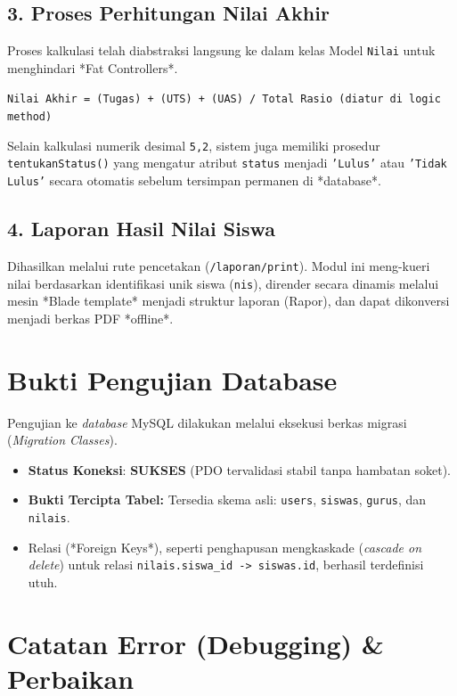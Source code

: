 \documentclass[12pt, a4paper]{article}
\begin{document}
\subsection{3. Proses Perhitungan Nilai Akhir}
Proses kalkulasi telah diabstraksi langsung ke dalam kelas Model \texttt{Nilai} untuk menghindari *Fat Controllers*. 
\begin{center}
\texttt{Nilai Akhir = (Tugas) + (UTS) + (UAS) / Total Rasio (diatur di logic method)}
\end{center}
Selain kalkulasi numerik desimal \texttt{5,2}, sistem juga memiliki prosedur \texttt{tentukanStatus()} yang mengatur atribut \texttt{status} menjadi \texttt{'Lulus'} atau \texttt{'Tidak Lulus'} secara otomatis sebelum tersimpan permanen di *database*.

\subsection{4. Laporan Hasil Nilai Siswa}
Dihasilkan melalui rute pencetakan (\texttt{/laporan/print}). Modul ini meng-kueri nilai berdasarkan identifikasi unik siswa (\texttt{nis}), dirender secara dinamis melalui mesin *Blade template* menjadi struktur laporan (Rapor), dan dapat dikonversi menjadi berkas PDF *offline*.

\section{Bukti Pengujian Database}
Pengujian ke \textit{database} MySQL dilakukan melalui eksekusi berkas migrasi (\textit{Migration Classes}). 
\begin{itemize}
    \item \textbf{Status Koneksi}: \textbf{SUKSES} (PDO tervalidasi stabil tanpa hambatan soket).
    \item \textbf{Bukti Tercipta Tabel:} Tersedia skema asli: \texttt{users}, \texttt{siswas}, \texttt{gurus}, dan \texttt{nilais}.
    \item Relasi (*Foreign Keys*), seperti penghapusan mengkaskade (\textit{cascade on delete}) untuk relasi \texttt{nilais.siswa\_id -> siswas.id}, berhasil terdefinisi utuh.
\end{itemize}

\section{Catatan Error (Debugging) \& Perbaikan}
\end{document}
